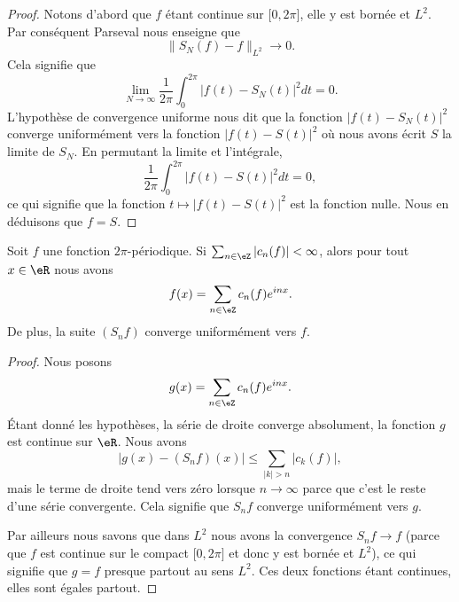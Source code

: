 \begin{proof}
    Notons d'abord que \( f\) étant continue sur \(\mathopen[ 0 , 2\pi \mathclose]\), elle y est bornée et \( L^2\). Par conséquent Parseval nous enseigne que 
    \begin{equation}
        \| S_N(f)-f \|_{L^2}\to 0.
    \end{equation}
    Cela signifie que
    \begin{equation}
        \lim_{N\to \infty} \frac{1}{ 2\pi }\int_{0}^{2\pi}| f(t)-S_N(t) |^2dt=0.
    \end{equation}
    L'hypothèse de convergence uniforme nous dit que la fonction \( | f(t)-S_N(t) |^2\) converge uniformément vers la fonction \( | f(t)-S(t) |^2\) où nous avons écrit \( S\) la limite de \( S_N\). En permutant la limite et l'intégrale,
    \begin{equation}
        \frac{1}{ 2\pi }\int_0^{2\pi}| f(t)-S(t) |^2dt=0,
    \end{equation}
    ce qui signifie que la fonction \( t\mapsto | f(t)-S(t) |^2\) est la fonction nulle. Nous en déduisons que \( f=S\).
\end{proof}

\begin{proposition}     \label{PropSgvPab}
    Soit \( f\) une fonction \( 2\pi\)-périodique. Si \( \sum_{n\in \eZ}| c_n(f) |<\infty\), alors pour tout \( x\in \eR\) nous avons
    \begin{equation}
        f(x)=\sum_{n\in \eZ}c_n(f) e^{inx}.
    \end{equation}
    De plus, la suite \( (S_nf)\) converge uniformément vers \( f\).
\end{proposition}

\begin{proof}
    Nous posons 
    \begin{equation}
        g(x)=\sum_{n\in \eZ}c_n(f) e^{inx}.
    \end{equation}
    Étant donné les hypothèses, la série de droite converge absolument, la fonction \( g\) est continue sur \( \eR\). Nous avons
    \begin{equation}
        \big| g(x)-(S_nf)(x) \big|\leq \sum_{| k |> n}| c_k(f) |,
    \end{equation}
    mais le terme de droite tend vers zéro lorsque \( n\to \infty\) parce que c'est le reste d'une série convergente. Cela signifie que \( S_nf\) converge uniformément vers \( g\).

    Par ailleurs nous savons que dans \( L^2\) nous avons la convergence \( S_nf\to f\) (parce que \( f\) est continue sur le compact \( \mathopen[ 0 , 2\pi \mathclose]\) et donc y est bornée et \( L^2\)), ce qui signifie que \( g=f\) presque partout au sens \( L^2\). Ces deux fonctions étant continues, elles sont égales partout.
\end{proof}

